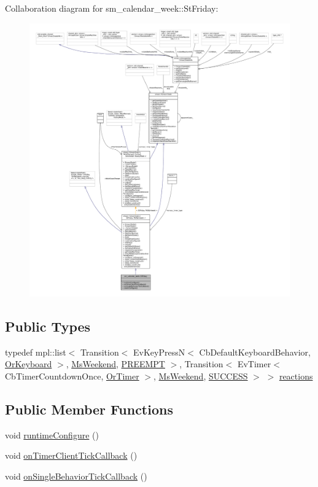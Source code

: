 Collaboration diagram for sm\+\_\+calendar\+\_\+week\+:\+:St\+Friday\+:
\nopagebreak
\begin{figure}[H]
\begin{center}
\leavevmode
\includegraphics[width=350pt]{structsm__calendar__week_1_1StFriday__coll__graph}
\end{center}
\end{figure}
\subsection*{Public Types}
\begin{DoxyCompactItemize}
\item 
typedef mpl\+::list$<$ Transition$<$ Ev\+Key\+PressN$<$ Cb\+Default\+Keyboard\+Behavior, \hyperlink{classsm__calendar__week_1_1OrKeyboard}{Or\+Keyboard} $>$, \hyperlink{classsm__calendar__week_1_1MsWeekend}{Ms\+Weekend}, \hyperlink{classPREEMPT}{P\+R\+E\+E\+M\+PT} $>$, Transition$<$ Ev\+Timer$<$ Cb\+Timer\+Countdown\+Once, \hyperlink{classsm__calendar__week_1_1OrTimer}{Or\+Timer} $>$, \hyperlink{classsm__calendar__week_1_1MsWeekend}{Ms\+Weekend}, \hyperlink{classSUCCESS}{S\+U\+C\+C\+E\+SS} $>$ $>$ \hyperlink{structsm__calendar__week_1_1StFriday_a3086092f43c6f0426130aa46b55edaab}{reactions}
\end{DoxyCompactItemize}
\subsection*{Public Member Functions}
\begin{DoxyCompactItemize}
\item 
void \hyperlink{structsm__calendar__week_1_1StFriday_a5fce56702b4d55872f82dc77194e9067}{runtime\+Configure} ()
\item 
void \hyperlink{structsm__calendar__week_1_1StFriday_a79317a2a67708590e046d49627a30a55}{on\+Timer\+Client\+Tick\+Callback} ()
\item 
void \hyperlink{structsm__calendar__week_1_1StFriday_a3d697235b90c176eb1524cd76c2d628f}{on\+Single\+Behavior\+Tick\+Callback} ()
\end{DoxyCompactItemize}
